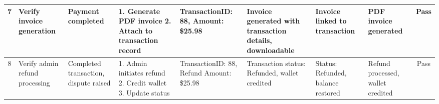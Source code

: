 \begin{table}[H]
{\begin{tabular}{|c|p{3cm}|p{2.5cm}|p{3.5cm}|p{3cm}|p{3cm}|p{2.5cm}|p{2.5cm}|c|}
7 & Verify invoice generation & Payment completed & 1. Generate PDF invoice 2. Attach to transaction record & TransactionID: 88, Amount: \$25.98 & Invoice generated with transaction details, downloadable & Invoice linked to transaction & PDF invoice generated & Pass \\ \hline
8 & Verify admin refund processing & Completed transaction, dispute raised & 1. Admin initiates refund 2. Credit wallet 3. Update status & TransactionID: 88, Refund Amount: \$25.98 & Transaction status: Refunded, wallet credited & Status: Refunded, balance restored & Refund processed, wallet credited & Pass \\ \hline
\end{tabular}%
}
\label{tab:ut_payment}
\end{table}


